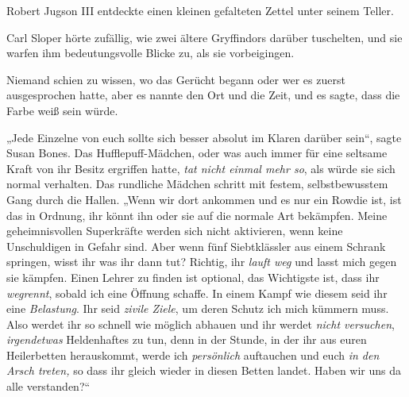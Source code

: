 Robert Jugson III entdeckte einen kleinen gefalteten Zettel unter seinem Teller.

Carl Sloper hörte zufällig, wie zwei ältere Gryffindors darüber tuschelten, und sie warfen ihm bedeutungsvolle Blicke zu, als sie vorbeigingen.

Niemand schien zu wissen, wo das Gerücht begann oder wer es zuerst ausgesprochen hatte, aber es nannte den Ort und die Zeit, und es sagte, dass die Farbe weiß sein würde.

\later

„Jede Einzelne von euch sollte sich besser absolut im Klaren darüber sein“, sagte Susan Bones. Das Hufflepuff-Mädchen, oder was auch immer für eine seltsame Kraft von ihr Besitz ergriffen hatte, \emph{tat nicht einmal mehr so}, als würde sie sich normal verhalten. Das rundliche Mädchen schritt mit festem, selbstbewusstem Gang durch die Hallen. „Wenn wir dort ankommen und es nur ein Rowdie ist, ist das in Ordnung, ihr könnt ihn oder sie auf die normale Art bekämpfen. Meine geheimnisvollen Superkräfte werden sich nicht aktivieren, wenn keine Unschuldigen in Gefahr sind. Aber wenn fünf Siebtklässler aus einem Schrank springen, wisst ihr was ihr dann tut? Richtig, ihr \emph{lauft weg} und lasst mich gegen sie kämpfen. Einen Lehrer zu finden ist optional, das Wichtigste ist, dass ihr \emph{wegrennt}, sobald ich eine Öffnung schaffe. In einem Kampf wie diesem seid ihr eine \emph{Belastung}. Ihr seid \emph{zivile Ziele}, um deren Schutz ich mich kümmern muss. Also werdet ihr so schnell wie möglich abhauen und ihr werdet \emph{nicht versuchen}, \emph{irgendetwas} Heldenhaftes zu tun, denn in der Stunde, in der ihr aus euren Heilerbetten herauskommt, werde ich \emph{persönlich} auftauchen und euch \emph{in den Arsch treten,} so dass ihr gleich wieder in diesen Betten landet. Haben wir uns da alle verstanden?“

